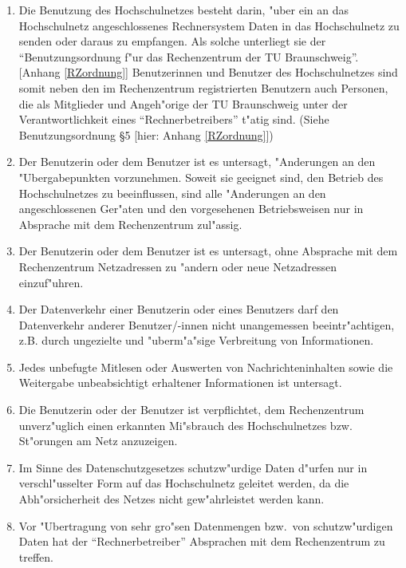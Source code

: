 \begin{enumerate}
  \item Die Benutzung des Hochschulnetzes besteht darin, "uber
    ein an das Hochschulnetz angeschlossenes Rechnersystem Daten
    in das Hochschulnetz zu senden oder daraus zu empfangen.
    Als solche unterliegt sie der "`Benutzungsordnung f"ur das
    Rechenzentrum der TU Braunschweig"'. [Anhang \ref{RZordnung}]
    Benutzerinnen und Benutzer des Hochschulnetzes sind somit neben den im
    Rechenzentrum registrierten Benutzern auch Personen, die als Mitglieder
    und Angeh"orige der TU Braunschweig unter der Verantwortlichkeit eines
    "`Rechnerbetreibers"' t"atig sind. (Siehe Benutzungsordnung \S{}5 [hier:
    Anhang \ref{RZordnung}])

  \item Der Benutzerin oder dem Benutzer ist es untersagt,
    "Anderungen an den "Ubergabepunkten vorzunehmen.
    Soweit sie geeignet sind, den Betrieb des Hochschulnetzes
    zu beeinflussen, sind alle "Anderungen an den
    angeschlossenen Ger"aten und den vorgesehenen
    Betriebsweisen nur in Absprache mit dem Rechenzentrum
    zul"assig.

  \item Der Benutzerin oder dem Benutzer ist es untersagt, ohne
    Absprache mit dem Rechenzentrum Netzadressen zu "andern
    oder neue Netzadressen einzuf"uhren.

  \item Der Datenverkehr einer Benutzerin oder eines Benutzers darf den
    Datenverkehr anderer Benutzer/-innen nicht unangemessen
    beeintr"achtigen, z.B. durch ungezielte und
    "uberm"a"sige Verbreitung von Informationen.

  \item Jedes unbefugte Mitlesen oder Auswerten von Nachrichteninhalten
    sowie die Weitergabe unbeabsichtigt erhaltener Informationen
    ist untersagt.

  \item Die Benutzerin oder der Benutzer ist verpflichtet, dem
    Rechenzentrum unverz"uglich einen erkannten Mi"sbrauch
    des Hochschulnetzes bzw. St"orungen am Netz anzuzeigen.

  \item Im Sinne des Datenschutzgesetzes schutzw"urdige Daten d"urfen nur in
    verschl"usselter Form auf das Hochschulnetz geleitet werden, da die
    Abh"orsicherheit des Netzes nicht gew"ahrleistet werden kann.

  \item Vor "Ubertragung von sehr gro"sen Datenmengen bzw.\  von
    schutzw"urdigen Daten hat der "`Rechnerbetreiber"' Absprachen
    mit dem Rechenzentrum zu treffen.
\end{enumerate}

